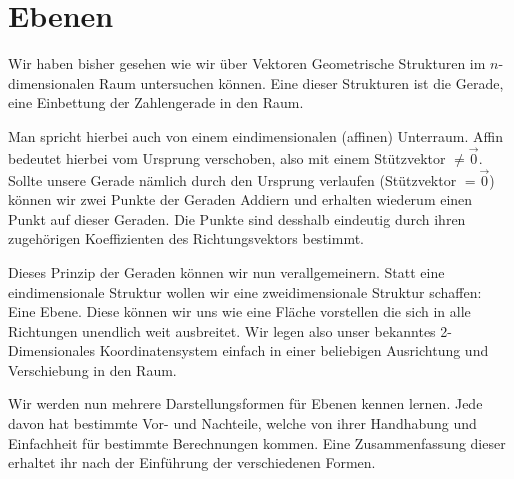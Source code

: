 \documentclass[a4paper,12pt]{article}
\newcommand{\Bemerkung}[1]{
	\vspace*{0.3cm}
	\begin{tcolorbox}[breakable,colback=yellow!10,colframe=yellow!65!black,title=\textbf{Bemerkung:},width=\linewidth ]
		{#1}
	\end{tcolorbox}
}
\begin{document}
	\section{Ebenen}
	Wir haben bisher gesehen wie wir über Vektoren Geometrische Strukturen im $n$-dimensionalen Raum untersuchen können. Eine dieser Strukturen ist die Gerade, eine Einbettung der Zahlengerade in den Raum. 
	\Bemerkung{Man spricht hierbei auch von einem eindimensionalen (affinen) Unterraum. Affin bedeutet hierbei 
	vom Ursprung verschoben, also mit einem Stützvektor $\neq \vec{0}$. Sollte unsere Gerade nämlich 
	durch den Ursprung verlaufen (Stützvektor $=\vec{0}$)  können wir zwei Punkte der Geraden Addiern und 
	erhalten wiederum einen Punkt auf dieser Geraden. Die Punkte sind desshalb eindeutig durch ihren 
	zugehörigen Koeffizienten des Richtungsvektors bestimmt.}
	 Dieses Prinzip der Geraden können wir nun verallgemeinern. Statt eine eindimensionale Struktur wollen
	 wir eine zweidimensionale Struktur schaffen: Eine Ebene. 
	 Diese können wir uns wie eine Fläche vorstellen die sich in alle Richtungen unendlich weit ausbreitet. 
	 Wir legen also unser bekanntes 2-Dimensionales Koordinatensystem einfach in einer
	 beliebigen Ausrichtung und Verschiebung in den Raum.
	\begin{center}
	\end{center}
	Wir werden nun mehrere Darstellungsformen für Ebenen kennen lernen. Jede davon hat bestimmte Vor- und 
	Nachteile, welche von ihrer Handhabung und Einfachheit für bestimmte Berechnungen kommen.
	Eine Zusammenfassung dieser erhaltet ihr nach der Einführung der verschiedenen Formen.
\end{document}
